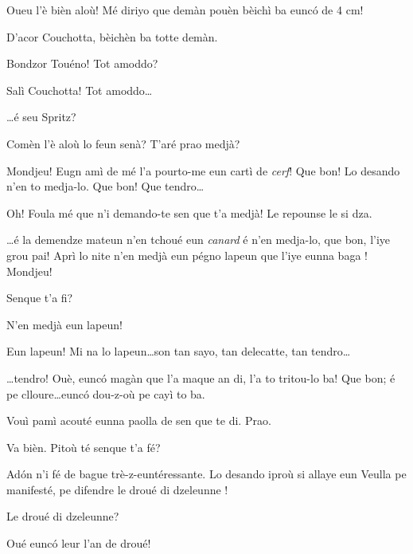 \begin{drama}
\Gerominespeaks{} Oueu l'è bièn aloù!  Mé diriyo que  demàn pouèn bèichì ba eunc\'o de 4 cm!

\Sandrinospeaks D’acor Couchotta, bèichèn ba totte demàn.


\Gerominespeaks{} Bondzor Touéno! Tot amoddo?

\Tuenospeaks Salì Couchotta! Tot amoddo\ldots

\Gerominespeaks{} \ldots é seu Spritz?


\Gerominespeaks{} Comèn l'è aloù lo feun senà? T'aré prao medjà?

\Tuenospeaks Mondjeu! Eugn amì de mé l'a pourto-me eun cartì de \textit{cerf}! Que bon! Lo desando n'en to medja-lo. Que bon! Que tendro\ldots

\Gerominespeaks Oh! Foula mé que n'i demando-te sen que t'a medjà! Le repounse le si dza.

\Tuenospeaks \ldots é la demendze mateun n'en tchoué eun \textit{canard} é n'en medja-lo, que bon, l'iye grou pai! Aprì lo nite n'en medjà eun pégno lapeun que l'iye eunna baga \gustoso ! Mondjeu!

\Gerominespeaks	{} Senque t'a fi?

\Tuenospeaks N'en medjà eun lapeun!

\Gerominespeaks Eun lapeun!  Mi na lo lapeun\ldots son tan sayo, tan delecatte, tan tendro\ldots

\Tuenospeaks \ldots tendro! Ouè, eunc\'o magàn que l'a maque an di, l'a to tritou-lo ba! Que bon; é pe clloure\ldots eunc\'o dou-z-où pe cayì to ba.

\Gerominespeaks Vouì pamì acouté eunna paolla de sen que te di. Prao.

\Tuenospeaks Va bièn. Pitoù té senque t'a fé? 

\Gerominespeaks{} Ad\'on n'i fé de bague trè-z-euntéressante. Lo desando iproù si allaye eun Veulla pe manifesté, pe difendre le droué di dzeleunne \gallina ! 

\Tuenospeaks{} Le droué di dzeleunne?

\Gerominespeaks Oué eunc\'o leur l'an de droué!


\end{drama}
